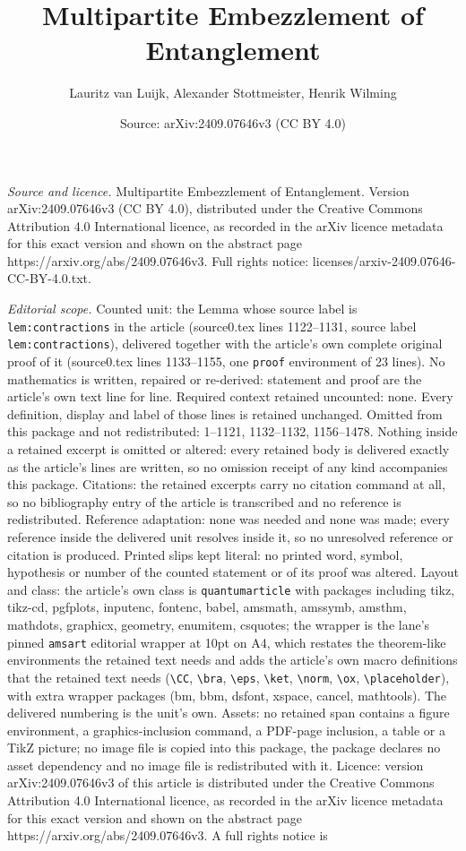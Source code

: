 \documentclass[10pt,a4paper]{amsart}
\title[Multipartite Embezzlement of Entanglement]{Multipartite Embezzlement of Entanglement}
\author{Lauritz van Luijk, Alexander Stottmeister, Henrik Wilming}
\date{Source: arXiv:2409.07646v3 (CC BY 4.0)}
\begin{document}
\maketitle

\noindent\emph{Source and licence.} Multipartite Embezzlement of Entanglement. Version arXiv:2409.07646v3 (CC BY 4.0), distributed under the Creative Commons Attribution 4.0 International licence, as recorded in the arXiv licence metadata for this exact version and shown on the abstract page https://arxiv.org/abs/2409.07646v3. Full rights notice: licenses/arxiv-2409.07646-CC-BY-4.0.txt.\par\smallskip

\noindent\textit{Editorial scope.} Counted unit: the Lemma whose source label is \texttt{lem:contractions} in the article (source0.tex lines 1122--1131, source label \texttt{lem:contractions}), delivered together with the article's own complete original proof of it (source0.tex lines 1133--1155, one \texttt{proof} environment of 23 lines). No mathematics is written, repaired or re-derived: statement and proof are the article's own text line for line. Required context retained uncounted: none. Every definition, display and label of those lines is retained unchanged. Omitted from this package and not redistributed: 1--1121, 1132--1132, 1156--1478. Nothing inside a retained excerpt is omitted or altered: every retained body is delivered exactly as the article's lines are written, so no omission receipt of any kind accompanies this package. Citations: the retained excerpts carry no citation command at all, so no bibliography entry of the article is transcribed and no reference is redistributed. Reference adaptation: none was needed and none was made; every reference inside the delivered unit resolves inside it, so no unresolved reference or citation is produced. Printed slips kept literal: no printed word, symbol, hypothesis or number of the counted statement or of its proof was altered. Layout and class: the article's own class is \texttt{quantumarticle} with packages including tikz, tikz-cd, pgfplots, inputenc, fontenc, babel, amsmath, amssymb, amsthm, mathdots, graphicx, geometry, enumitem, csquotes; the wrapper is the lane's pinned \texttt{amsart} editorial wrapper at 10pt on A4, which restates the theorem-like environments the retained text needs and adds the article's own macro definitions that the retained text needs (\texttt{\textbackslash CC}, \texttt{\textbackslash bra}, \texttt{\textbackslash eps}, \texttt{\textbackslash ket}, \texttt{\textbackslash norm}, \texttt{\textbackslash ox}, \texttt{\textbackslash placeholder}), with extra wrapper packages (bm, bbm, dsfont, xspace, cancel, mathtools). The delivered numbering is the unit's own. Assets: no retained span contains a figure environment, a graphics-inclusion command, a PDF-page inclusion, a table or a TikZ picture; no image file is copied into this package, the package declares no asset dependency and no image file is redistributed with it. Licence: version arXiv:2409.07646v3 of this article is distributed under the Creative Commons Attribution 4.0 International licence, as recorded in the arXiv licence metadata for this exact version and shown on the abstract page https://arxiv.org/abs/2409.07646v3. A full rights notice is 
\end{document}
